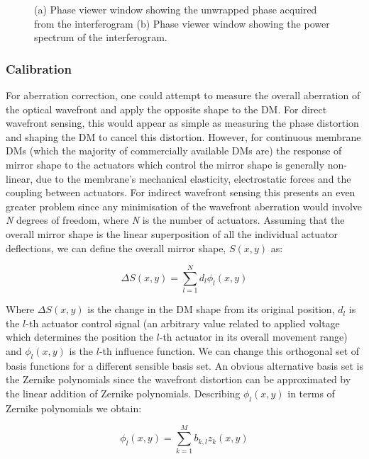 \begin{figure}[h]
\begin{subfigure}{0.45\textwidth}
		\caption{}
		\label{fig:phase_viewer_ft}
	\end{subfigure}
	\caption{(a) Phase viewer window showing the unwrapped phase acquired from the interferogram (b) Phase viewer window showing the power spectrum of the interferogram. }
	\label{fig:phase_viewer}
\end{figure}

\subsubsection{Calibration}
\label{subsubsec:calibration}

For aberration correction, one could attempt to measure the overall aberration of the optical wavefront and apply the opposite shape to the DM. For direct wavefront sensing, this would appear as simple as measuring the phase distortion and shaping the DM to cancel this distortion. However, for continuous membrane DMs (which the majority of commercially available DMs are) the response of mirror shape to the actuators which control the mirror shape is generally non-linear, due to the membrane's mechanical elasticity, electrostatic forces and the coupling between actuators.\cite{Zhu:99} For indirect wavefront sensing this presents an even greater problem since any minimisation of the wavefront aberration would involve \textit{N} degrees of freedom, where \textit{N} is the number of actuators. Assuming that the overall mirror shape is the linear superposition of all the individual actuator deflections, we can define the overall mirror shape, $S(x,y)$ as:

\begin{equation}\label{eq:surface_shape}
\Delta S(x,y) = \sum_{l=1}^{N} d_{l}\phi_{l}(x,y)
\end{equation}

Where $\Delta S(x,y)$ is the change in the DM shape from its original position, $d_l$ is the $l$-th actuator control signal (an arbitrary value related to applied voltage which determines the position the $l$-th actuator in its overall movement range)	and $\phi_{l}(x,y)$ is the $l$-th influence function. We can change this orthogonal set of basis functions for a different sensible basis set. An obvious alternative basis set is the Zernike polynomials since the wavefront distortion can be approximated by the linear addition of Zernike polynomials.\cite{von1934beugungstheorie,noll1976zernike} Describing $\phi_{l}(x,y)$ in terms of Zernike polynomials we obtain:

\begin{equation}\label{eq:influence_to_zernike}
\phi_{l}(x,y) = \sum_{k=1}^{M} b_{k,l}z_{k}(x,y)
\end{equation}

